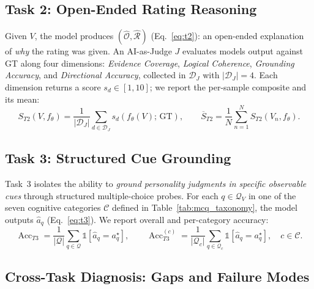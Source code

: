 \documentclass{llmxive}
\begin{document}
\subsection{Task 2: Open-Ended Rating Reasoning}
\label{sec:task2}

Given $V$, the model produces $(\hat{\mathcal{O}}, \hat{\mathcal{R}})$ (Eq.~\ref{eq:t2}): an open-ended explanation of \emph{why} the rating was given. An AI-as-Judge $J$ evaluates models output against GT along four dimensions: \emph{Evidence Coverage}, \emph{Logical Coherence}, \emph{Grounding Accuracy}, and \emph{Directional Accuracy}, collected in $\mathcal{D}_{\!J}$ with $|\mathcal{D}_{\!J}|=4$. Each dimension returns a score $s_d \in [1,10]$; we report the per-sample composite and its mean:
\vspace{-0.2cm}
\begin{equation}
S_{T2}(V, f_\theta) = \frac{1}{|\mathcal{D}_{\!J}|}\sum_{d \in \mathcal{D}_{\!J}} s_d\!\left(f_\theta(V);\, \text{GT}\right),
\qquad
\overline{S}_{T2} = \frac{1}{N}\sum_{n=1}^{N} S_{T2}(V_n, f_\theta).
\label{eq:t2_avg4}
\end{equation}
\vspace{-0.7cm}

\subsection{Task 3: Structured Cue Grounding}
\label{sec:task3}

Task~3 isolates the ability to \emph{ground personality judgments in specific observable cues} through structured multiple-choice probes. For each $q\!\in\!\mathcal{Q}_V$ in one of the seven cognitive categories $\mathcal{C}$ defined in Table~\ref{tab:mcq_taxonomy}, the model outputs $\hat{a}_q$ (Eq.~\ref{eq:t3}). We report overall and per-category accuracy:
\begin{equation}
\operatorname{Acc}_{T3} = \frac{1}{|\mathcal{Q}|}\sum_{q\in\mathcal{Q}} \mathbb{1}[\hat{a}_q = a_q^\star],
\qquad
\operatorname{Acc}_{T3}^{(c)} = \frac{1}{|\mathcal{Q}_c|}\sum_{q\in\mathcal{Q}_c} \mathbb{1}[\hat{a}_q = a_q^\star], \quad c\in\mathcal{C}.
\label{eq:t3_metrics}
\end{equation}
\vspace{-0.7cm}

\subsection{Cross-Task Diagnosis: Gaps and Failure Modes}
\label{sec:cross_task}\label{sec:failure_modes}
\end{document}
